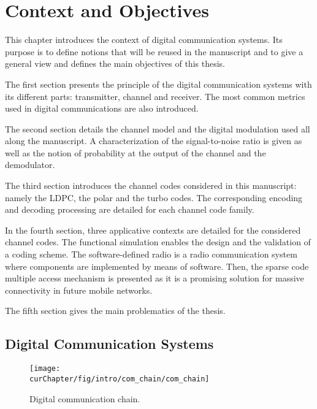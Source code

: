 
\newcommand{\curChapter}{main/chapter1}

\chapter{Context and Objectives}
\label{chap:ctx}

This chapter introduces the context of digital communication systems. Its
purpose is to define notions that will be reused in the manuscript and to give
a general view and defines the main objectives of this thesis.

The first section presents the principle of the digital communication systems
with its different parts: transmitter, channel and receiver.
The most common metrics used in digital communications are also introduced.

The second section details the channel model and the digital modulation used all
along the manuscript. A characterization of the signal-to-noise ratio is given
as well as the notion of probability at the output of the channel and the
demodulator.

The third section introduces the channel codes considered in this manuscript:
namely the LDPC, the polar and the turbo codes. The corresponding encoding and
decoding processing are detailed for each channel code family.

In the fourth section, three applicative contexts are detailed for the
considered channel codes. The functional simulation enables the design and the
validation of a coding scheme. The software-defined radio is a radio
communication system where components are implemented by means of software.
Then, the sparse code multiple access mechanism is presented as it is a
promising solution for massive connectivity in future mobile networks.

The fifth section gives the main problematics of the thesis.

\vspace*{\fill}
\minitoccustom
\vspace*{\fill}

\section{Digital Communication Systems}
\label{sec:ctx_digital_communication_systems}

\begin{figure}[htp]
  \centering
  \texttt{[image: \\curChapter/fig/intro/com\_chain/com\_chain]}
  \caption{Digital communication chain.}
  \label{fig:ctx_com_chain}
\end{figure}

